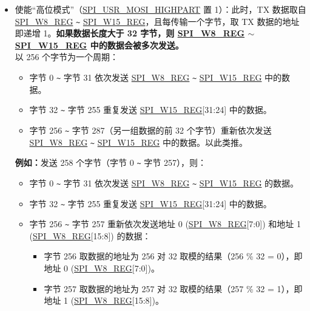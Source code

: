 \documentclass[main\_\_CN.tex]{subfiles}
\begin{document}
\begin{itemize}
\begin{itemize}
        \item 使能“高位模式”（\hyperref[fielddesc:SPIUSRMOSIHIGHPART]{SPI\_USR\_MOSI\_HIGHPART} 置 1）：此时，TX 数据取自 \hyperref[regdesc:SPIW0REG]{SPI\_W8\_REG} \verb+~+ \hyperref[regdesc:SPIW0REG]{SPI\_W15\_REG}，且每传输一个字节，取 TX 数据的地址即递增 1。\textbf{如果数据长度大于 32 字节，则 \hyperref[regdesc:SPIW0REG]{SPI\_W8\_REG} $\sim$ \hyperref[regdesc:SPIW0REG]{SPI\_W15\_REG} 中的数据会被多次发送。}\\
        以 256 个字节为一个周期：
        \begin{itemize}
            \item 字节 0 \verb+~+ 字节 31 依次发送 \hyperref[regdesc:SPIW0REG]{SPI\_W8\_REG} \verb+~+ \hyperref[regdesc:SPIW0REG]{SPI\_W15\_REG} 中的数据。
            \item 字节 32 \verb+~+ 字节 255 重复发送 \hyperref[regdesc:SPIW0REG]{SPI\_W15\_REG}[31:24] 中的数据。
            \item 字节 256 \verb+~+ 字节 287（另一组数据的前 32 个字节）重新依次发送 \hyperref[regdesc:SPIW0REG]{SPI\_W8\_REG} \verb+~+ \hyperref[regdesc:SPIW0REG]{SPI\_W15\_REG} 中的数据。以此类推。
        \end{itemize}
        \textbf{例如：}发送 258 个字节（字节 0 \verb+~+ 字节 257），则：
        \begin{itemize}
            \item 字节 0 \verb+~+ 字节 31 依次发送 \hyperref[regdesc:SPIW0REG]{SPI\_W8\_REG} \verb+~+ \hyperref[regdesc:SPIW0REG]{SPI\_W15\_REG} 的数据。
            \item 字节 32 \verb+~+ 字节 255 重复发送 \hyperref[regdesc:SPIW0REG]{SPI\_W15\_REG}[31:24] 中的数据。
            \item 字节 256 \verb+~+ 字节 257 重新依次发送地址 0 (\hyperref[regdesc:SPIW0REG]{SPI\_W8\_REG}[7:0]) 和地址 1 (\hyperref[regdesc:SPIW0REG]{SPI\_W8\_REG}[15:8]) 的数据：
                \begin{itemize}
                    \item 字节 256 取数据的地址为 256 对 32 取模的结果（256 \% 32 = 0），即地址 0 (\hyperref[regdesc:SPIW0REG]{SPI\_W8\_REG}[7:0])。
                    \item 字节 257 取数据的地址为 257 对 32 取模的结果（257 \% 32 = 1），即地址 1 (\hyperref[regdesc:SPIW0REG]{SPI\_W8\_REG}[15:8])。
                \end{itemize}
        \end{itemize}



\end{itemize}
\end{itemize}
\end{document}

